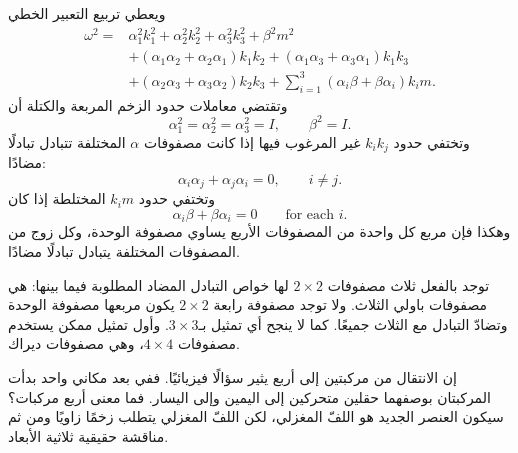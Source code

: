ويعطي تربيع التعبير الخطي
\begin{align}
\omega^2
={}&
\alpha_1^2k_1^2+\alpha_2^2k_2^2+\alpha_3^2k_3^2+\beta^2m^2
\nonumber\\
&+(\alpha_1\alpha_2+\alpha_2\alpha_1)k_1k_2
+(\alpha_1\alpha_3+\alpha_3\alpha_1)k_1k_3
\nonumber\\
&+(\alpha_2\alpha_3+\alpha_3\alpha_2)k_2k_3
+\sum_{i=1}^{3}(\alpha_i\beta+\beta\alpha_i)k_i m.
\end{align}
وتقتضي معاملات حدود الزخم المربعة والكتلة أن
\begin{equation}
\alpha_1^2=\alpha_2^2=\alpha_3^2=I,
\qquad
\beta^2=I.
\end{equation}
وتختفي حدود \(k_i k_j\) غير المرغوب فيها إذا كانت مصفوفات \(\alpha\) المختلفة تتبادل تبادلًا مضادًا:
\begin{equation}
\alpha_i\alpha_j+\alpha_j\alpha_i=0,
\qquad i\neq j.
\end{equation}
وتختفي حدود \(k_i m\) المختلطة إذا كان
\begin{equation}
\alpha_i\beta+\beta\alpha_i=0
\qquad
\text{for each }i.
\end{equation}
وهكذا فإن مربع كل واحدة من المصفوفات الأربع يساوي مصفوفة الوحدة، وكل زوج من المصفوفات المختلفة يتبادل تبادلًا مضادًا.

توجد بالفعل ثلاث مصفوفات \(2\times2\) لها خواص التبادل المضاد المطلوبة فيما بينها: هي مصفوفات باولي الثلاث. ولا توجد مصفوفة رابعة \(2\times2\) يكون مربعها مصفوفة الوحدة وتضادّ التبادل مع الثلاث جميعًا. كما لا ينجح أي تمثيل بـ\(3\times3\). وأول تمثيل ممكن يستخدم مصفوفات \(4\times4\)، وهي مصفوفات ديراك.

إن الانتقال من مركبتين إلى أربع يثير سؤالًا فيزيائيًا. ففي بعد مكاني واحد بدأت المركبتان بوصفهما حقلين متحركين إلى اليمين وإلى اليسار. فما معنى أربع مركبات؟ سيكون العنصر الجديد هو اللفّ المغزلي، لكن اللفّ المغزلي يتطلب زخمًا زاويًا ومن ثم مناقشة حقيقية ثلاثية الأبعاد.

